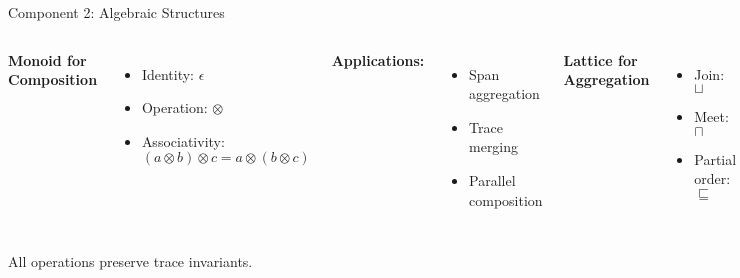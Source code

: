 \documentclass[aspectratio=169,xcolor=dvipsnames]{beamer}
\begin{document}
\begin{frame}{Component 2: Algebraic Structures}
\begin{columns}[T]
\textbf{Monoid for Composition}
\begin{itemize}
    \item Identity: $\epsilon$
    \item Operation: $\otimes$
    \item Associativity: $(a \otimes b) \otimes c = a \otimes (b \otimes c)$
\end{itemize}

\textbf{Applications:}
\begin{itemize}
    \item Span aggregation
    \item Trace merging
    \item Parallel composition
\end{itemize}

\textbf{Lattice for Aggregation}
\begin{itemize}
    \item Join: $\sqcup$
    \item Meet: $\sqcap$
    \item Partial order: $\sqsubseteq$
\end{itemize}

\textbf{Applications:}
\begin{itemize}
    \item Timestamp ordering
    \item Attribute merging
    \item Causality tracking
\end{itemize}
\end{columns}

\vspace{1em}
\begin{theorem}
All operations preserve trace invariants.
\end{theorem}
\end{frame}
\end{document}
